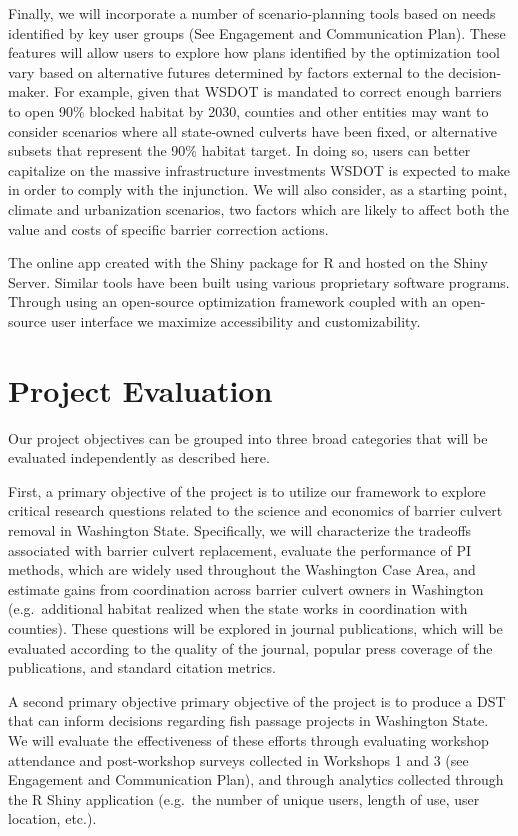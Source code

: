 Finally, we will incorporate a number of scenario-planning tools based on needs identified by key user groups (See Engagement and Communication Plan). These features will allow users to explore how plans identified by the optimization tool vary based on alternative futures determined by factors external to the decision-maker. For example, given that WSDOT is mandated to correct enough barriers to open 90\% blocked habitat by 2030, counties and other entities may want to consider scenarios where all state-owned culverts have been fixed, or alternative subsets that represent the 90\% habitat target. In doing so, users can better capitalize on the massive infrastructure investments WSDOT is expected to make in order to comply with the injunction. We will also consider, as a starting point, climate and urbanization scenarios, two factors which are likely to affect both the value and costs of specific barrier correction actions.
  
The online app created with the Shiny package for R and hosted on the Shiny Server. Similar tools have been built using various proprietary software programs. Through using an open-source optimization framework coupled with an open-source user interface we maximize accessibility and customizability. 


\section{Project Evaluation}

Our project objectives can be grouped into three broad categories that will be evaluated independently as described here. 

First, a primary objective of the project is to utilize our framework to explore critical research questions related to the science and economics of barrier culvert removal in Washington State. Specifically, we will characterize the tradeoffs associated with barrier culvert replacement, evaluate the performance of PI methods, which are widely used throughout the Washington Case Area, and estimate gains from coordination across barrier culvert owners in Washington (e.g.\ additional habitat realized when the state works in coordination with counties). These questions will be explored in journal publications, which will be evaluated according to the quality of the journal, popular press coverage of the publications, and standard citation metrics.


A second primary objective primary objective of the project is to produce a DST that can inform decisions regarding fish passage projects in Washington State.  We will evaluate the effectiveness of these efforts through evaluating workshop attendance and post-workshop surveys collected in Workshops 1 and 3 (see Engagement and Communication Plan), and through analytics collected through the R Shiny application (e.g.\ the number of unique users, length of use, user location, etc.).

